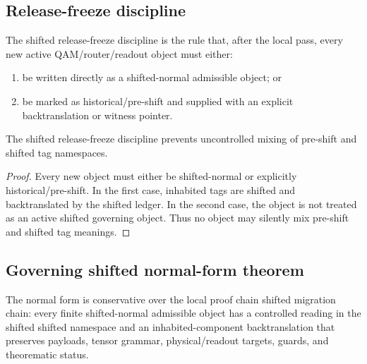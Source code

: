 \subsection{Release-freeze discipline}
\label{subsec:v400-r05-release-freeze-discipline}

\begin{definition}
\label{def:v400-r05-shifted-release-freeze-discipline}
The shifted release-freeze discipline is the rule that, after the local pass, every new active
QAM/router/readout object must either:
\begin{enumerate}[leftmargin=*]
 \item be written directly as a shifted-normal admissible object; or
 \item be marked as historical/pre-shift and supplied with an explicit
 backtranslation or witness pointer.
\end{enumerate}
\end{definition}

\begin{lemma}
\label{lem:v400-r05-release-freeze-prevents-mixed-namespace-drift}
The shifted release-freeze discipline prevents uncontrolled mixing of pre-shift and shifted
tag namespaces.
\end{lemma}

\begin{proof}
Every new object must either be shifted-normal or explicitly historical/pre-shift. In
the first case, inhabited tags are shifted and backtranslated by the shifted ledger.
In the second case, the object is not treated as an active shifted governing object.
Thus no object may silently mix pre-shift and shifted tag meanings.
\end{proof}

\subsection{Governing shifted normal-form theorem}
\label{subsec:v400-r05-governing-shifted-normal-form-theorem}

\begin{theorem}
\label{thm:v400-r05-governing-shifted-normal-form-theorem}
The normal form is conservative over the local proof chain shifted migration chain:
every finite shifted-normal admissible object has a controlled reading in the
shifted shifted namespace and an inhabited-component backtranslation that preserves
payloads, tensor grammar, physical/readout targets, guards, and theorematic
status.
\end{theorem}

